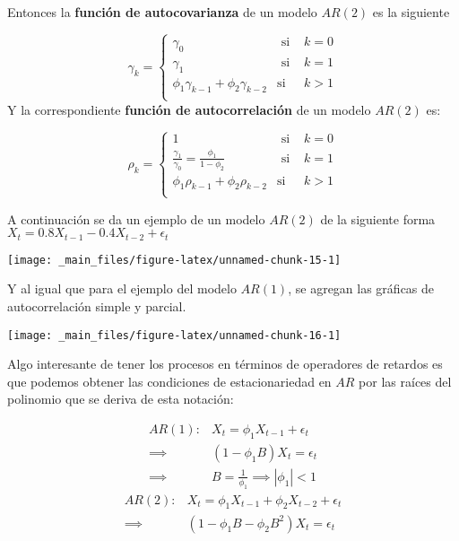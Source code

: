 \documentclass[
  a4paper,
  oneside,
  openany]{book}
\begin{document}
Entonces la \textbf{función de autocovarianza} de un modelo \(AR(2)\) es la siguiente

\[
\gamma_k = \left\{
\begin{array}{ccc}
\gamma_0 & \mbox{   si }& k=0\\
\gamma_1 & \mbox{   si }& k=1\\
\phi_1\gamma_{k-1}+\phi_2\gamma_{k-2}& \mbox{si} & k>1\\
\end{array}
\right.
\]
Y la correspondiente \textbf{función de autocorrelación} de un modelo \(AR(2)\) es:

\[
\rho_k = \left\{
\begin{array}{ccc}
1 & \mbox{   si }& k=0\\
\frac{\gamma_1}{\gamma_0} = \frac{\phi_1}{1-\phi_2} & \mbox{   si }& k=1\\
\phi_1\rho_{k-1}+\phi_2\rho_{k-2}& \mbox{si}& k>1\\
\end{array}
\right.
\]

A continuación se da un ejemplo de un modelo \(AR(2)\) de la siguiente forma \(X_t=0.8X_{t-1}-0.4X_{t-2}+\epsilon_t\)

\begin{center}\texttt{[image: \_main\_files/figure-latex/unnamed-chunk-15-1]} \end{center}

Y al igual que para el ejemplo del modelo \(AR(1)\), se agregan las gráficas de autocorrelación simple y parcial.

\begin{center}\texttt{[image: \_main\_files/figure-latex/unnamed-chunk-16-1]} \end{center}

Algo interesante de tener los procesos en términos de operadores de retardos es que podemos obtener las condiciones de estacionariedad en \(AR\) por las raíces del polinomio que se deriva de esta notación:

\[
\begin{split}
AR(1):& X_t = \phi_1 X_{t-1}+\epsilon_t\\
\implies & (1-\phi_1 B)X_t = \epsilon_t\\
\implies &B = \frac{1}{\phi_1}\implies |\phi_1|<1
\end{split}
\]
\[
\begin{split}
AR(2):& X_t = \phi_1X_{t-1}+\phi_2X_{t-2}+\epsilon_t\\
\implies & (1-\phi_1B-\phi_2B^2)X_t = \epsilon_t
\end{split}
\]
\end{document}
